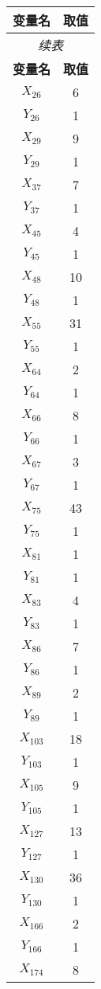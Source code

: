 \documentclass[a4paper,10pt]{article}
\begin{document}
\begin{center}
\begin{longtable}{cc}
\toprule
\textbf{变量名} & \textbf{取值} \\
\midrule
\endfirsthead
\multicolumn{2}{c}{\textit{续表}} \\
\toprule
\textbf{变量名} & \textbf{取值} \\
\midrule
\endhead
\bottomrule
\endfoot
\bottomrule
\endlastfoot
$X_{26}$ & 6 \\
$Y_{26}$ & 1 \\
$X_{29}$ & 9 \\
$Y_{29}$ & 1 \\
$X_{37}$ & 7 \\
$Y_{37}$ & 1 \\
$X_{45}$ & 4 \\
$Y_{45}$ & 1 \\
$X_{48}$ & 10 \\
$Y_{48}$ & 1 \\
$X_{55}$ & 31 \\
$Y_{55}$ & 1 \\
$X_{64}$ & 2 \\
$Y_{64}$ & 1 \\
$X_{66}$ & 8 \\
$Y_{66}$ & 1 \\
$X_{67}$ & 3 \\
$Y_{67}$ & 1 \\
$X_{75}$ & 43 \\
$Y_{75}$ & 1 \\
$X_{81}$ & 1 \\
$Y_{81}$ & 1 \\
$X_{83}$ & 4 \\
$Y_{83}$ & 1 \\
$X_{86}$ & 7 \\
$Y_{86}$ & 1 \\
$X_{89}$ & 2 \\
$Y_{89}$ & 1 \\
$X_{103}$ & 18 \\
$Y_{103}$ & 1 \\
$X_{105}$ & 9 \\
$Y_{105}$ & 1 \\
$X_{127}$ & 13 \\
$Y_{127}$ & 1 \\
$X_{130}$ & 36 \\
$Y_{130}$ & 1 \\
$X_{166}$ & 2 \\
$Y_{166}$ & 1 \\
$X_{174}$ & 8 \\

\end{longtable}
\end{center}
\end{document}

